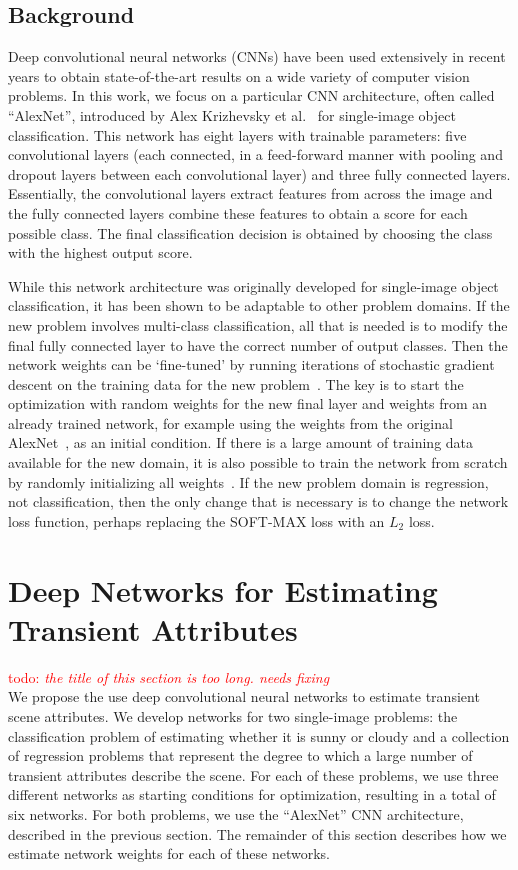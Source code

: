\documentclass[10pt,twocolumn,letterpaper]{article}
\newcommand{\todo}[1]{\textcolor{red}{todo: {\em #1}}}
\begin{document}
\subsection{Background}
\indent
Deep convolutional neural networks (CNNs) have been used extensively in recent
years to obtain state-of-the-art results on a wide variety of computer vision
problems.  In this work, we focus on a particular CNN architecture, often
called ``AlexNet'', introduced by Alex Krizhevsky et al.~\cite{caffenetnips12}
for single-image object classification. This network has eight layers with
trainable parameters: five convolutional layers (each connected, in a
feed-forward manner with pooling and dropout layers between each convolutional
layer) and three fully connected layers. Essentially, the convolutional layers
extract features from across the image and the fully connected layers combine
these features to obtain a score for each possible class. The final
classification decision is obtained by choosing the class with the highest
output score.

While this network architecture was originally developed for single-image
object classification, it has been shown to be adaptable to other problem
domains. If the new problem involves multi-class classification, all that is
needed is to modify the final fully connected layer to have the correct number
of output classes. Then the network weights can be `fine-tuned' by running
iterations of stochastic gradient descent on the training data for the new
problem~\cite{yosinski2014transferable}.  The key is to start the optimization
with random weights for the new final layer and weights from an already trained
network, for example using the weights from the original
AlexNet~\cite{caffenetnips12}, as an initial condition. If there is a large
amount of training data available for the new domain, it is also possible to
train the network from scratch by randomly initializing all
weights~\cite{zhou2014places}.  If the new problem domain is regression, not
classification, then the only change that is necessary is to change the network
loss function, perhaps replacing the SOFT-MAX loss with an $L_2$ loss.

\section{Deep Networks for Estimating Transient Attributes}
\todo{the title of this section is too long. needs fixing} \\
\indent
We propose the use deep convolutional neural networks to estimate transient
scene attributes. We develop networks for two single-image problems: the
classification problem of estimating whether it is sunny or cloudy and a
collection of regression problems that represent the degree to which a large
number of transient attributes describe the scene.  For each of these problems,
we use three different networks as starting conditions for optimization,
resulting in a total of six networks.  For both problems, we use the
``AlexNet'' CNN architecture, described in the previous section.  The remainder
of this section describes how we estimate network weights for each of these
networks.
\end{document}
